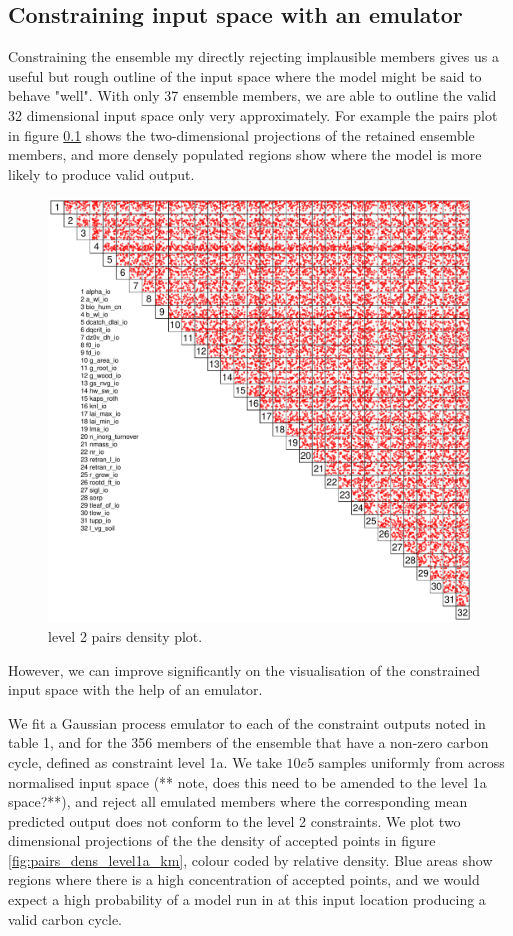 \documentclass[gmd, manuscript]{copernicus}
\begin{document}
\subsection{Constraining input space with an emulator}

Constraining the ensemble my directly rejecting implausible members gives us a useful but rough outline of the input space where the model might be said to behave "well". With only 37 ensemble members, we are able to outline the valid 32 dimensional input space only very approximately. For example the pairs plot in figure \ref{} shows the two-dimensional projections of the retained ensemble members, and more densely populated regions show where the model is more likely to produce valid output.

\begin{figure}[t]
\includegraphics[width=12cm]{./graphics/pairs_level2_inputs.pdf}
\caption{level 2 pairs density plot.}
\label{fig:pairs_level2_inputs}
\end{figure}

However, we can improve significantly on the visualisation of the constrained input space with the help of an emulator. 

We fit a Gaussian process emulator to each of the constraint outputs noted in table 1, and for the 356 members of the ensemble that have a non-zero carbon cycle, defined as constraint level 1a. We take $10e5$ samples uniformly from across normalised input space (** note, does this need to be amended to the level 1a space?**), and reject all emulated members where the corresponding mean predicted output does not conform to the level 2 constraints. We plot two dimensional projections of the the density of accepted points in figure \ref{fig:pairs_dens_level1a_km}, colour coded by relative density. Blue areas show regions where there is a high concentration of accepted points, and we would expect a high probability of a model run in at this input location producing a valid carbon cycle.
\end{document}
